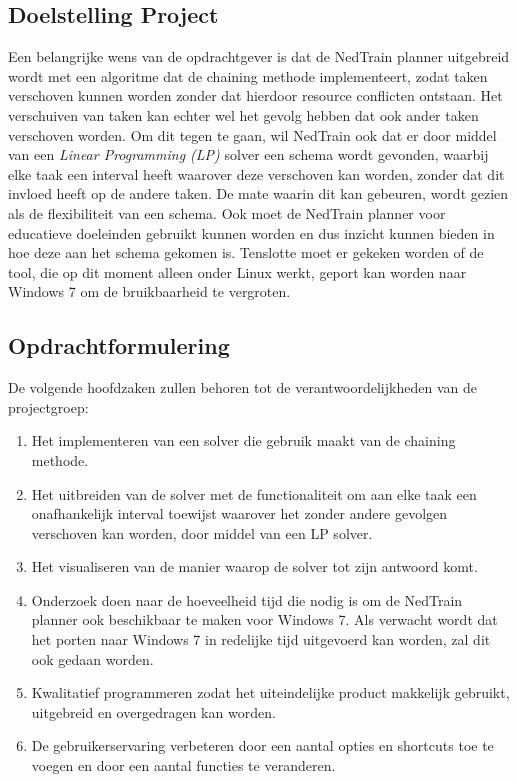 \subsection{Doelstelling Project}
Een belangrijke wens van de opdrachtgever is dat de NedTrain planner uitgebreid wordt met een algoritme dat de chaining methode implementeert, zodat taken verschoven kunnen worden zonder dat hierdoor resource conflicten ontstaan. Het verschuiven van taken kan echter wel het gevolg hebben dat ook ander taken verschoven worden. Om dit tegen te gaan, wil NedTrain ook dat er door middel van een \emph{Linear Programming (LP)} solver een schema wordt gevonden, waarbij elke taak een interval heeft waarover deze verschoven kan worden, zonder dat dit invloed heeft op de andere taken. De mate waarin dit kan gebeuren, wordt gezien als de flexibiliteit van een schema. Ook moet de NedTrain planner voor educatieve doeleinden gebruikt kunnen worden en dus inzicht kunnen bieden in hoe deze aan het schema gekomen is. Tenslotte moet er gekeken worden of de tool, die op dit moment alleen onder Linux werkt, geport kan worden naar Windows 7 om de bruikbaarheid te vergroten.

\newpage

\subsection{Opdrachtformulering}
\label{subsec:opdrachtformulering}
De volgende hoofdzaken zullen behoren tot de verantwoordelijkheden van de projectgroep:
\begin{enumerate}
	\item \label{enum:chaining} Het implementeren van een solver die gebruik maakt van de chaining methode.
	\item \label{enum:LP} Het uitbreiden van de solver met de functionaliteit om aan elke taak een onafhankelijk interval toewijst waarover het zonder andere gevolgen verschoven kan worden, door middel van een LP solver.
	\item \label{enum:visueel} Het visualiseren van de manier waarop de solver tot zijn antwoord komt.
	\item \label{enum:windows} Onderzoek doen naar de hoeveelheid tijd die nodig is om de NedTrain planner ook beschikbaar te maken voor Windows 7. Als verwacht wordt dat het porten naar Windows 7 in redelijke tijd uitgevoerd kan worden, zal dit ook gedaan worden. 
	\item \label{enum:kwaliteit} Kwalitatief programmeren zodat het uiteindelijke product makkelijk gebruikt, uitgebreid en overgedragen kan worden.
	\item \label{enum:gebruiker} De gebruikerservaring verbeteren door een aantal opties en shortcuts toe te voegen en door een aantal functies te veranderen.
\end{enumerate}

